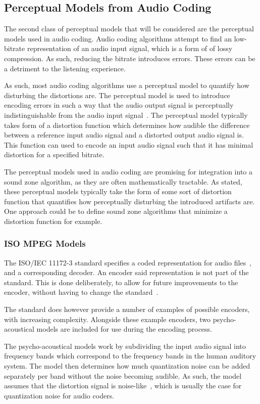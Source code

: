 \subsection{Perceptual Models from Audio Coding }
\label{ch:perceptual:review:audio_coding}
The second class of perceptual models that will be considered are the perceptual models used in audio coding.
Audio coding algorithms attempt to find an low-bitrate representation of an audio input signal, which is a 
form of of lossy compression.
As such, reducing the bitrate introduces errors.
These errors can be a detriment to the listening experience.

As such, most audio coding algorithms use a perceptual model to quantify how disturbing the distortions are.
The perceptual model is used to introduce encoding errors in such a way that the audio output
signal is perceptually indistinguishable from the audio input signal~\cite{taal2012low}.
The perceptual model typically takes form of a distortion function which determines how
audible the difference between a reference input audio signal and a distorted output audio signal is.
This function can used to encode an input audio signal such that it has minimal distortion for a
specified bitrate.

The perceptual models used in audio coding are promising for integration into a sound zone algorithm, as they are 
often mathematically tractable.
As stated, these perceptual models typically take the form of some sort of distortion function that quantifies
how perceptually disturbing the introduced artifacts are. 
One approach could be to define sound zone algorithms that minimize a distortion function for example.

\subsubsection{ISO MPEG Models}
The ISO/IEC 11172-3 standard specifies a coded representation for audio files~\cite{ISO11172-3}, 
and a corresponding decoder.
An encoder said representation is not part of the standard.
This is done deliberately, to allow for future improvements to the encoder, without having to change the standard~\cite{pan1995tutorial}.

The standard does however provide a number of examples of possible encoders, with increasing complexity.
Alongside these example encoders, two psycho-acoustical models are included for use during the encoding process. 

The psycho-acoustical models work by subdividing the input audio signal into frequency bands which correspond to the 
frequency bands in the human auditory system.
The model then determines how much quantization noise can be added separately per band without the noise becoming audible.
As such, the model assumes that the distortion signal is noise-like~\cite{van2005perceptual}, which is usually
the case for quantization noise for audio coders.

